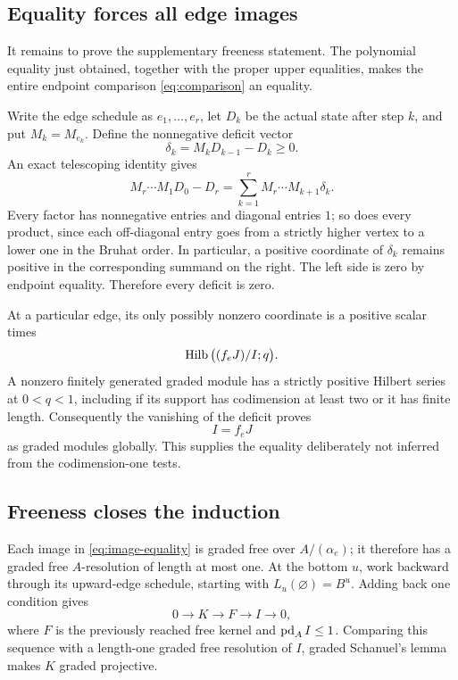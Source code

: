 \subsection{Equality forces all edge images}
It remains to prove the supplementary freeness statement.
The polynomial equality just obtained, together with the proper
upper equalities, makes the entire endpoint comparison
\eqref{eq:comparison} an equality.

Write the edge schedule as \(e_1,\ldots,e_r\), let \(D_k\) be the
actual state after step \(k\), and put \(M_k=M_{e_k}\).
Define the nonnegative deficit vector
\[
 \delta_k=M_kD_{k-1}-D_k\ge0.
\]
An exact telescoping identity gives
\begin{equation}\label{eq:deficit}
 M_r\cdots M_1D_0-D_r
 =\sum_{k=1}^r M_r\cdots M_{k+1}\delta_k.
\end{equation}
Every factor has nonnegative entries and diagonal entries \(1\);
so does every product, since each off-diagonal entry goes from a
strictly higher vertex to a lower one in the Bruhat order.
In particular, a positive coordinate of \(\delta_k\) remains positive
in the corresponding summand on the right.
The left side is zero by endpoint equality.
Therefore every deficit is zero.

At a particular edge, its only possibly nonzero coordinate is a
positive scalar times
\[
 \operatorname{Hilb}\big((f_eJ)/I;q\big).
\]
A nonzero finitely generated graded module has a strictly positive
Hilbert series at \(0<q<1\), including if its support has codimension
at least two or it has finite length.
Consequently the vanishing of the deficit proves
\begin{equation}\label{eq:image-equality}
 I=f_eJ
\end{equation}
as graded modules globally.
This supplies the equality deliberately not inferred from the
codimension-one tests.

\subsection{Freeness closes the induction}
Each image in \eqref{eq:image-equality} is graded free over
\(A/(\alpha_e)\); it therefore has a graded free \(A\)-resolution
of length at most one.
At the bottom \(u\), work backward through its upward-edge schedule,
starting with \(L_u(\varnothing)=B^u\).
Adding back one condition gives
\[
 0\longrightarrow K\longrightarrow F\longrightarrow I\longrightarrow0,
\]
where \(F\) is the previously reached free kernel and
\(\operatorname{pd}_A I\le1\).
Comparing this sequence with a length-one graded free resolution
of \(I\), graded Schanuel's lemma makes \(K\) graded projective.

